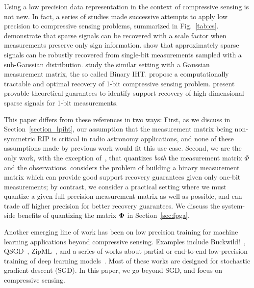 \documentclass[aoas,preprint]{imsart}
\numberwithin{equation}{section}
\theoremstyle{plain}
\begin{document}
Using a low precision data representation in the context of compressive sensing
is not new. In fact, a series of studies made successive attempts to apply low precision  
to compressive sensing problems, summarized in
Fig.~\ref{tab:cs}. \cite{boufounos20091bitcs} demonstrate that sparse signals can be recovered with a scale factor when measurements preserve only sign information. \cite{ai20121bitcs, davenport20121bit} show that approximately sparse signals can be robustly recovered from single-bit measurements sampled with a sub-Gaussian distribution. \cite{jacques20111bit, laska20111bitcs} study the similar setting with a Gaussian measurement matrix, the so called Binary IHT. \cite{plan20111bitcs, plan20121bitcs} propose a computationally tractable and optimal recovery of 1-bit compressive sensing problem. \cite{recht20121bitcs, gopi20131bitcs} present provable theoretical guarantees to identify support recovery of high dimensional sparse signals for 1-bit measurements. 
\vspace{0.5em}

{This paper differs from these references
in two ways: First, as we discuss in Section~\ref{section_lpiht},
our assumption that the measurement matrix being
non-symmetric RIP is critical in radio astronomy applications, 
and none of these assumptions made by previous work would fit  this use case. Second, we are the only work,
with the exception of~\cite{gopi20131bitcs}, that quantizes
{\em both} the measurement matrix $\Phi$ and the observations.
\cite{gopi20131bitcs} considers the problem of building a  binary measurement matrix which can provide good support recovery guarantees given only one-bit measurements; by contrast, we consider a practical setting where we must quantize a given full-precision measurement matrix as well as possible, and can trade off higher precision for better recovery guarantees. 
We discuss the system-side benefits  
of quantizing the matrix ${\bf \Phi}$ in Section~\ref{sec:fpga}. 

} 
\vspace{0.5em}



Another emerging line of work has been on low precision training for 
machine learning applications beyond compressive
sensing. Examples include Buckwild!~\cite{desa2015hogwild},
QSGD~\cite{alistarh2016qsgd},  
ZipML~\cite{zhang2017zipml}, and
a series of works about 
partial or end-to-end low-precision training 
of deep learning models~\cite{seide2014sgd1bit, hubara2016qsnn, rastegari2016binarycnn,zhou2016cnn, miyashita2016cnn, li2016twn, gupta2015dl}.
Most of these works are designed for stochastic gradient descent (SGD). In this paper, we 
go beyond SGD, and focus on  compressive sensing.
\end{document}
